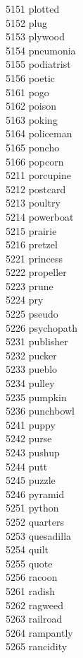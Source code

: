 5151 plotted \\
5152 plug \\
5153 plywood \\
5154 pneumonia \\
5155 podiatrist \\
5156 poetic \\
5161 pogo \\
5162 poison \\
5163 poking \\
5164 policeman \\
5165 poncho \\
5166 popcorn \\
5211 porcupine \\
5212 postcard \\
5213 poultry \\
5214 powerboat \\
5215 prairie \\
5216 pretzel \\
5221 princess \\
5222 propeller \\
5223 prune \\
5224 pry \\
5225 pseudo \\
5226 psychopath \\
5231 publisher \\
5232 pucker \\
5233 pueblo \\
5234 pulley \\
5235 pumpkin \\
5236 punchbowl \\
5241 puppy \\
5242 purse \\
5243 pushup \\
5244 putt \\
5245 puzzle \\
5246 pyramid \\
5251 python \\
5252 quarters \\
5253 quesadilla \\
5254 quilt \\
5255 quote \\
5256 racoon \\
5261 radish \\
5262 ragweed \\
5263 railroad \\
5264 rampantly \\
5265 rancidity \\
